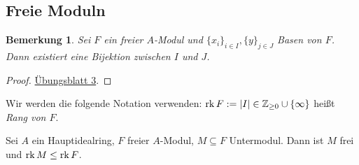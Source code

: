 \documentclass[12pt,a4paper]{scrartcl}
\theoremstyle{cplain}
\theoremstyle{cdef}
\newtheorem{beme}[thmcounter]{Bemerkung}
\begin{document}
\subsection{Freie Moduln}
\begin{beme}
	Sei $F$ ein freier $A$-Modul und $\{x_i\}_{i\in I}, \{y\}_{j\in J}$ Basen von $F$. Dann existiert eine Bijektion zwischen $I$ und $J$.
\end{beme}
\begin{proof}
	\href{http://www.math.uni-bonn.de/ag/stroppel/Franzen_Algebra_1_Uebung/Blatt3.pdf}{Übungsblatt 3}.
\end{proof}

Wir werden die folgende Notation verwenden: $\operatorname{rk} F := \lvert I\rvert \in\mathbb Z_{\geq 0}\cup \{\infty\}$ heißt \emph{Rang von $F$}.

\begin{satz} \label{thm:untermoduln freier moduln in hir}
	Sei $A$ ein Hauptidealring, $F$ freier $A$-Modul, $M\subseteq F$ Untermodul. Dann ist $M$ frei und $\operatorname{rk} M\leq \operatorname{rk} F$.
\end{satz}
\end{document}
